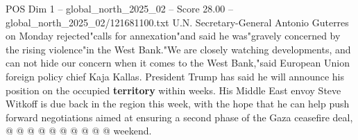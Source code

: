 \begin{textsample}{POS Dim 1 – global\_north\_2025\_02 – Score 28.00 – global\_north\_2025\_02/121681100.txt}
U.N.
Secretary-General Antonio Guterres on Monday rejected"calls for annexation"and said he was"gravely concerned by the rising violence"in the West Bank."We are closely watching developments, and can not hide our concern when it comes to the West Bank,"said European Union foreign policy chief Kaja Kallas.
President Trump has said he will announce his position on the occupied \textbf{territory} within weeks.
His Middle East envoy Steve Witkoff is due back in the region this week, with the hope that he can help push forward negotiations aimed at ensuring a second phase of the Gaza ceasefire deal, @ @ @ @ @ @ @ @ @ @ weekend.

\end{textsample}
